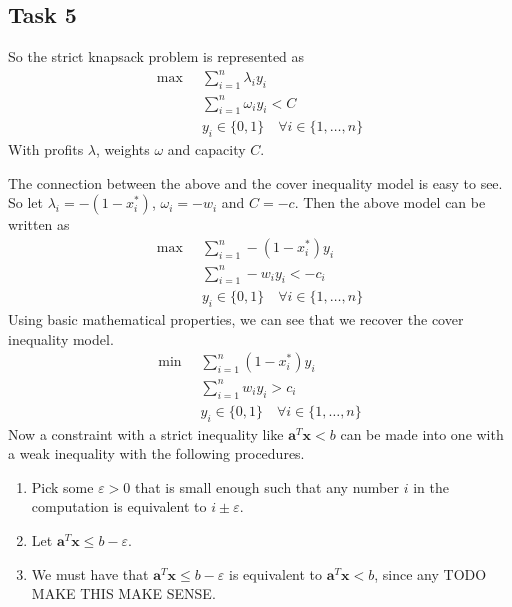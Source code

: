 \documentclass{article}
\theoremstyle{definition}
\theoremstyle{exercise}
\theoremstyle{remark}
\begin{document}
\subsection*{Task 5}
So the strict knapsack problem is represented as
\begin{align*}
    \max \;\; &\sum_{i=1}^{n} \lambda_{i} y_i  \\
    &\sum_{i=1}^{n} \omega_{i} y_i < C  \\
    &y_i \in \{0,1\} \quad \forall i \in \{1, \ldots, n\} 
\end{align*}
With profits $\lambda$, weights $\omega$ and capacity $C$.

The connection between the above and the cover inequality model is easy to see.
So let $\lambda_i = -( 1- x^*_i)$, $\omega_{i} = -w_i$ and $C = -c$.
Then the above model can be written as
\begin{align*}
    \max \;\; &\sum_{i=1}^{n} -(1 - x^*_i) y_i  \\
    &\sum_{i=1}^{n} -w_i y_i < -c_i  \\
    &y_i \in \{0,1\} \quad\forall i \in \{1, \ldots, n\} 
\end{align*}
Using basic mathematical properties, we can see that we recover the cover inequality model.
\begin{align*}
    \min \;\; &\sum_{i=1}^{n} (1 - x^*_i) y_i  \\
    &\sum_{i=1}^{n} w_i y_i > c_i  \\
    &y_i \in \{0,1\} \quad \forall i \in \{1, \ldots, n\} 
\end{align*}
Now a constraint with a strict inequality like $\mathbf{a}^{T}\mathbf{x} < b$ can be made into one with a weak inequality with the following procedures.
\begin{enumerate}[1.]
    \item Pick some $\varepsilon > 0$ that is small enough such that any number $i$ in the computation is equivalent to $i \pm \varepsilon$. %
    \item Let $\mathbf{a}^{T}\mathbf{x} \leq b - \varepsilon$.
    \item We must have that $\mathbf{a}^{T}\mathbf{x} \leq b - \varepsilon$ is equivalent to $\mathbf{a}^{T}\mathbf{x} < b$, since any TODO MAKE THIS MAKE SENSE.
\end{enumerate}

%
\end{document}
